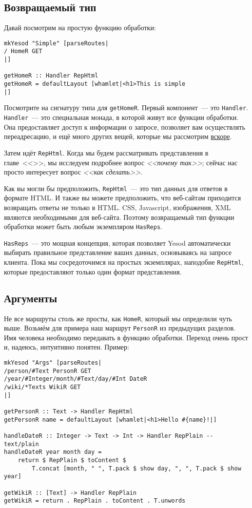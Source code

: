 \subsection{Возвращаемый тип}
Давай посмотрим на простую функцию обработки:
\begin{lstlisting}
mkYesod "Simple" [parseRoutes|
/ HomeR GET
|]

getHomeR :: Handler RepHtml
getHomeR = defaultLayout [whamlet|<h1>This is simple
|]
\end{lstlisting}

Посмотрите на сигнатуру типа для \lstinline!getHomeR!. Первый
компонент~--- это \lstinline!Handler!. \lstinline!Handler!~--- это
специальная монада, в которой живут все функции обработки. Она
предоставляет доступ к информации о запросе, позволяет вам
осуществлять переадресацию, и ещё много других вещей, которые мы
рассмотрим \hyperref[sec:handler-monad]{вскоре}.

Затем идёт \lstinline!RepHtml!. Когда мы будем рассматривать
представления в главе~<<>>,
мы исследуем подробнее вопрос \emph{<<почему так>>}; сейчас
нас просто интересует вопрос \emph{<<как сделать>>}.

Как вы могли бы предположить, \lstinline!RepHtml!~--- это тип данных
для ответов в формате HTML. И также вы можете предположить, что веб-сайтам
приходится возвращать ответы не только в HTML. CSS, Javascript,
изображения, XML являются необходимыми для веб-сайта. Поэтому
возвращаемый тип функции обработки может быть любым экземпляром
\lstinline!HasReps!.

\lstinline!HasReps!~--- это мощная концепция, которая позволяет Yesod
автоматически выбирать правильное представление ваших данных,
основываясь на запросе клиента. Пока мы сосредоточимся на простых
экземплярах, наподобие \lstinline!RepHtml!, которые предоставляют
только один формат представления.

\subsection{Аргументы}
Не все маршруты столь же просты, как \lstinline!HomeR!, который мы
определили чуть выше. Возьмём для примера наш маршрут
\lstinline!PersonR! из предыдущих разделов. Имя человека необходимо
передавать в функцию обработки. Переход очень прост и, надеюсь,
интуитивно понятен. Пример:
\begin{lstlisting}
mkYesod "Args" [parseRoutes|
/person/#Text PersonR GET
/year/#Integer/month/#Text/day/#Int DateR
/wiki/*Texts WikiR GET
|]

getPersonR :: Text -> Handler RepHtml
getPersonR name = defaultLayout [whamlet|<h1>Hello #{name}!|]

handleDateR :: Integer -> Text -> Int -> Handler RepPlain -- text/plain
handleDateR year month day =
    return $ RepPlain $ toContent $
        T.concat [month, " ", T.pack $ show day, ", ", T.pack $ show year]

getWikiR :: [Text] -> Handler RepPlain
getWikiR = return . RepPlain . toContent . T.unwords
\end{lstlisting}%

